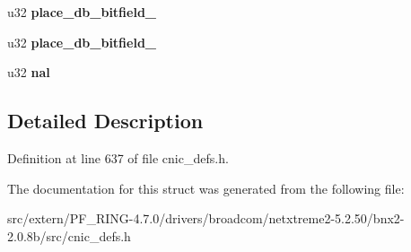 \begin{DoxyCompactItemize}
\item 
\hypertarget{structustorm__iscsi__placement__db_af9a503548fffed49e9a66a59d3474dac}{
u32 {\bfseries place\_\-db\_\-bitfield\_}}
\label{structustorm__iscsi__placement__db_af9a503548fffed49e9a66a59d3474dac}

\item 
\hypertarget{structustorm__iscsi__placement__db_a4a40515c78874056a9d2fff2f76612f7}{
u32 {\bfseries place\_\-db\_\-bitfield\_}}
\label{structustorm__iscsi__placement__db_a4a40515c78874056a9d2fff2f76612f7}

\item 
\hypertarget{structustorm__iscsi__placement__db_ad302940ac13c252b2c2b72eca6ae67d3}{
u32 {\bfseries nal}}
\label{structustorm__iscsi__placement__db_ad302940ac13c252b2c2b72eca6ae67d3}

\end{DoxyCompactItemize}


\subsection{Detailed Description}


Definition at line 637 of file cnic\_\-defs.h.



The documentation for this struct was generated from the following file:\begin{DoxyCompactItemize}
\item 
src/extern/PF\_\-RING-\/4.7.0/drivers/broadcom/netxtreme2-\/5.2.50/bnx2-\/2.0.8b/src/cnic\_\-defs.h\end{DoxyCompactItemize}
